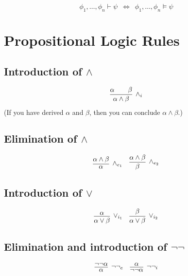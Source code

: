 \documentclass{article}
\newcommand{\rulename}[1]{#1}
\begin{document}
\[
\phi_{1},\ldots,\phi_{n}\vdash\psi\,\,\,\Longleftrightarrow\,\,\,\phi_{1},\ldots,\phi_{n}\vDash\psi
\]

\section*{Propositional Logic Rules}

\subsection*{Introduction of $\wedge$}
    \begin{align*}
      \infer[\rulename{\wedge_i}]
      {\alpha \wedge \beta}
      {\alpha && \beta}
    \end{align*}
    (If you have derived $\alpha$ and $\beta$, then you can conclude $\alpha \wedge \beta$.)
\subsection*{Elimination of $\wedge$}
    \begin{align*}
      \infer[\rulename{\wedge_{e_1}}]
      {\alpha}
      {\alpha \wedge \beta}
      &&
      \infer[\rulename{\wedge_{e_2}}]
      {\beta}
      {\alpha \wedge \beta}
    \end{align*}

\subsection*{Introduction of $\vee$}
    \begin{align*}
      \infer[\rulename{\vee_{i_1}}]
      {\alpha \vee \beta}
      {\alpha}&&
      \infer[\rulename{\vee_{i_2}}]
      {\alpha \vee \beta}
      {\beta}
    \end{align*}
    
\subsection*{Elimination and introduction of $\neg\neg$}
    \begin{align*}
      \infer[\rulename{\neg\neg_e}]
      {\alpha}
      {\neg\neg\alpha}
      &&
      \infer[\rulename{\neg\neg_i}]
      {\neg\neg\alpha}
      {\alpha}
    \end{align*}
    
\end{document}
